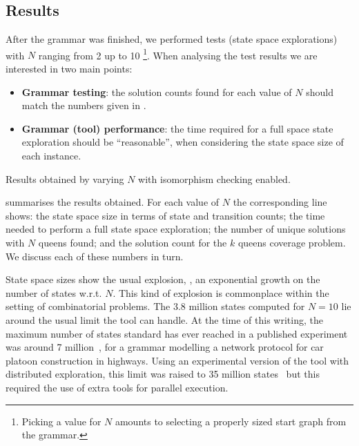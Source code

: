\subsection{Results}

After the grammar was finished, we performed tests (state space explorations)
with $N$ ranging from 2 up to 10 \footnote{Picking a value for $N$ amounts to
selecting a properly sized start graph from the grammar.}. When analysing the
test results we are interested in two main points:
%
\vspace{-3pt}
\begin{itemize}\itemsep-3pt
\item {\bf Grammar testing}: the solution counts found for each value of $N$
should match the numbers given in .
\item {\bf Grammar (tool) performance}: the time required for a full space
state exploration should be ``reasonable'', when considering the state space
size of each instance.
\vspace{-3pt}
\end{itemize}

\begin{table}[t]
\centering
\small

\caption{Results obtained by varying $N$ with isomorphism checking enabled.}
\vspace{-.5cm}
\end{table}

 summarises the results obtained. For each value of $N$ the
corresponding line shows: the state space size in terms of state and transition
counts; the time needed to perform a full state space exploration; the number
of unique solutions with $N$ queens found; and the solution count for the $k$
queens coverage problem. We discuss each of these numbers in turn.

State space sizes show the usual explosion, \ie, an exponential growth on the
number of states w.r.t. $N$. This kind of explosion is commonplace within the
setting of combinatorial problems. The 3.8 million states computed for $N =
10$ lie around the usual limit the tool can handle. At the time of this
writing, the maximum number of states standard \GROOVE has ever reached in a
published experiment was around 7 million~\cite{GMRZ10}, for a grammar
modelling a network protocol for car platoon construction in highways. Using
an experimental version of the tool with distributed exploration, this limit
was raised to 35 million states~\cite{BKR10} but this required the use of
extra tools for parallel execution.

